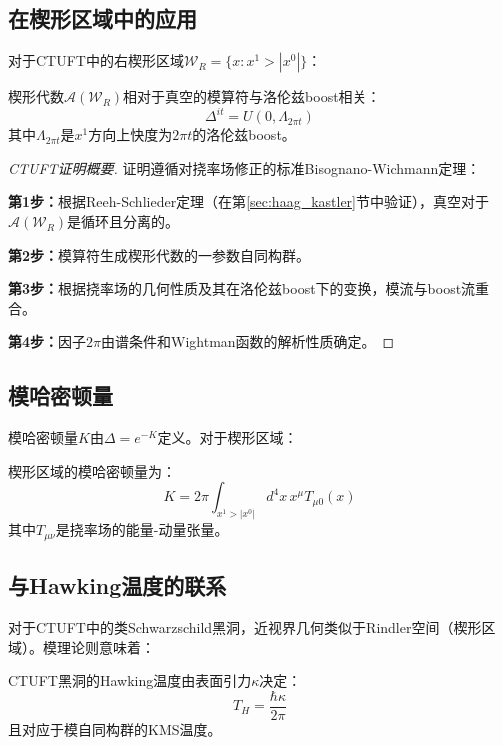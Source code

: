 \subsection{在楔形区域中的应用}

对于CTUFT中的右楔形区域$\mathcal{W}_R = \{ x : x^1 > |x^0| \}$：

\begin{theorem}
楔形代数$\mathcal{A}(\mathcal{W}_R)$相对于真空的模算符与洛伦兹boost相关：
\begin{equation}
    \Delta^{it} = U(0, \Lambda_{2\pi t})
\end{equation}
其中$\Lambda_{2\pi t}$是$x^1$方向上快度为$2\pi t$的洛伦兹boost。
\end{theorem}

\begin{proof}[CTUFT证明概要]
证明遵循对挠率场修正的标准Bisognano-Wichmann定理：

\textbf{第1步：}根据Reeh-Schlieder定理（在第\ref{sec:haag_kastler}节中验证），真空对于$\mathcal{A}(\mathcal{W}_R)$是循环且分离的。

\textbf{第2步：}模算符生成楔形代数的一参数自同构群。

\textbf{第3步：}根据挠率场的几何性质及其在洛伦兹boost下的变换，模流与boost流重合。

\textbf{第4步：}因子$2\pi$由谱条件和Wightman函数的解析性质确定。
\end{proof}

\subsection{模哈密顿量}

模哈密顿量$K$由$\Delta = e^{-K}$定义。对于楔形区域：

\begin{theorem}[模哈密顿量]
楔形区域的模哈密顿量为：
\begin{equation}
    K = 2\pi \int_{x^1 > |x^0|} d^4x \, x^\mu T_{\mu 0}(x)
\end{equation}
其中$T_{\mu\nu}$是挠率场的能量-动量张量。
\end{theorem}

\subsection{与Hawking温度的联系}

对于CTUFT中的类Schwarzschild黑洞，近视界几何类似于Rindler空间（楔形区域）。模理论则意味着：

\begin{theorem}[模理论中的Hawking温度]
CTUFT黑洞的Hawking温度由表面引力$\kappa$决定：
\begin{equation}
    T_H = \frac{\hbar \kappa}{2\pi}
\end{equation}
且对应于模自同构群的KMS温度。
\end{theorem}

